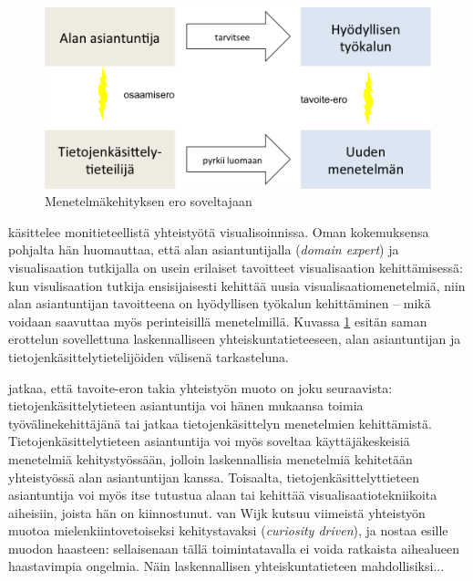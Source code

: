 \documentclass[finnish,gradu,twoside,12pt]{tktltiki}
\begin{document}
{\begin{figure}
\includegraphics[width=.6\textwidth]{images/monitieteellisyys_ongelma.png} 
\caption{Menetelmäkehityksen ero soveltajaan \citep[mukaillen][7]{Wijk2006}}
\label{fig:domain_expert_vs_computation_specialist}

\end{figure}

\citet{Wijk2006} käsittelee monitieteellistä yhteistyötä visualisoinnissa. Oman kokemuksensa pohjalta hän huomauttaa, että alan asiantuntijalla (\textit{domain expert}) ja visualisaation tutkijalla on usein erilaiset tavoitteet visualisaation kehittämisessä: kun visulisaation tutkija ensisijaisesti kehittää uusia visualisaatiomenetelmiä, niin alan asiantuntijan tavoitteena on hyödyllisen työkalun kehittäminen -- mikä voidaan saavuttaa myös perinteisillä menetelmillä. Kuvassa \ref{fig:domain_expert_vs_computation_specialist} esitän saman erottelun sovellettuna laskennalliseen yhteiskuntatieteeseen, alan asiantuntijan ja tietojenkäsittelytietelijöiden välisenä tarkasteluna.

\citet{Wijk2006} jatkaa, että tavoite-eron takia yhteistyön muoto on joku seuraavista: tietojenkäsittelytieteen asiantuntija voi hänen mukaansa toimia työvälinekehittäjänä tai jatkaa tietojenkäsittelyn menetelmien kehittämistä. Tietojenkäsittelytieteen asiantuntija voi myös soveltaa käyttäjäkeskeisiä menetelmiä kehitystyössään, jolloin laskennallisia menetelmiä kehitetään yhteistyössä alan asiantuntijan kanssa. Toisaalta, tietojenkäsittelyttieteen asiantuntija voi myös itse tutustua alaan tai kehittää visualisaatiotekniikoita aiheisiin, joista hän on kiinnostunut. van Wijk kutsuu viimeistä yhteistyön muotoa mielenkiintovetoiseksi kehitystavaksi (\textit{curiosity driven}), ja nostaa esille muodon haasteen: sellaisenaan tällä toimintatavalla ei voida ratkaista aihealueen haastavimpia ongelmia. Näin laskennallisen yhteiskuntatieteen mahdollisiksi... 

}
\end{document}

